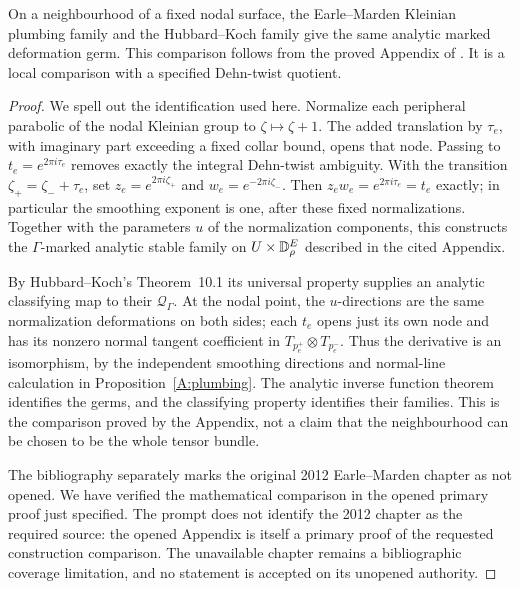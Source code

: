 \begin{proposition}
\label{A:EarleMarden-local}
On a neighbourhood of a fixed nodal surface, the Earle--Marden
Kleinian plumbing family and the Hubbard--Koch family give the same
analytic marked deformation germ. This comparison follows from the
proved Appendix of \citet[pp.~41--42 in the opened author version]
{HubbardKoch2014}. It is a local comparison with a specified
Dehn-twist quotient.
\end{proposition}

\begin{proof}
We spell out the identification used here. Normalize each peripheral
parabolic of the nodal Kleinian group to $\zeta\mapsto\zeta+1$.
The added translation by $\tau_e$, with imaginary part exceeding a
fixed collar bound, opens that node. Passing to
$t_e=e^{2\pi i\tau_e}$ removes exactly the integral Dehn-twist
ambiguity. With the transition $\zeta_+=\zeta_-+\tau_e$, set
$z_e=e^{2\pi i\zeta_+}$ and $w_e=e^{-2\pi i\zeta_-}$.
Then $z_ew_e=e^{2\pi i\tau_e}=t_e$ exactly; in particular the
smoothing exponent is one, after these fixed normalizations.
Together with the parameters $u$ of the normalization components,
this constructs the $\Gamma$-marked analytic stable family on
$U\times{\mathbb{D}}_\rho^E$ described in the cited Appendix.

By Hubbard--Koch's Theorem~10.1 its universal property supplies
an analytic classifying map to their $\mathcal Q_\Gamma$.
At the nodal point, the $u$-directions are the same normalization
deformations on both sides; each $t_e$ opens just its own node
and has its nonzero normal tangent coefficient in
$T_{p_e^+}\otimes T_{p_e^-}$. Thus the derivative is an
isomorphism, by the independent smoothing directions and
normal-line calculation in Proposition~\ref{A:plumbing}.
The analytic inverse function theorem identifies the germs, and
the classifying property identifies their families. This is the
comparison proved by the Appendix, not a claim that the
neighbourhood can be chosen to be the whole tensor bundle.

The bibliography separately marks the original 2012
Earle--Marden chapter as not opened. We have verified the
mathematical comparison in the opened primary proof just
specified. The prompt does not identify the 2012 chapter as the
required source: the opened Appendix is itself a primary proof of the
requested construction comparison. The unavailable chapter remains a
bibliographic coverage limitation, and no statement is accepted on its
unopened authority.
\end{proof}

